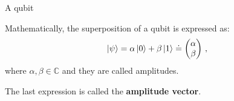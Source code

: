 \documentclass[10pt]{beamer}
\begin{document}
{
\begin{frame}[fragile]{A qubit}

Mathematically, the superposition of a qubit is expressed as:
\begin{equation}
\label{equ:simplequbit}
\ket{\psi} = \alpha \ket{0} + \beta \ket{1} \doteq \begin{pmatrix}\alpha\\\beta\end{pmatrix}\, ,
\end{equation}
where $\alpha, \beta \in \mathbb{C}$ and they are called amplitudes.


The last expression is called the \textbf{amplitude vector}.
\end{frame}
}
\end{document}
